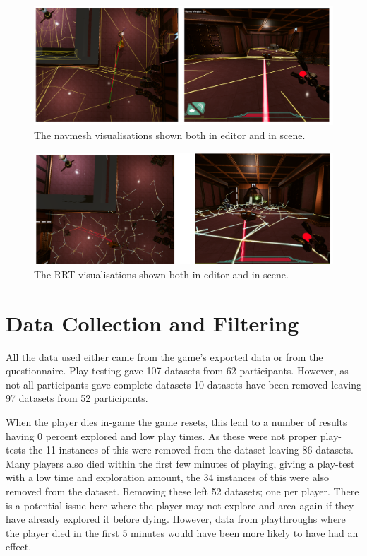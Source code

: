 \documentclass[journal]{IEEEtran}
\begin{document}
	\begin{figure}[h]
		\includegraphics[width=1.0\linewidth]{NavmeshVis.png}
		\caption{The navmesh visualisations shown both in editor and in scene.}
		\label{image:navmeshVisuals}
	\end{figure}  
	
	
	\begin{figure}[h]
		\includegraphics[width=1.0\linewidth]{RRTVis.png}
		\caption{The RRT visualisations shown both in editor and in scene.}
		\label{image:RRTVisuals}
	\end{figure}  
	
	\section{Data Collection and Filtering}  \label{datacollection}
	All the data used either came from the game's exported data or from the questionnaire.  Play-testing gave 107 datasets from 62 participants. However, as not all participants gave complete datasets 10 datasets have been removed leaving 97 datasets from 52 participants. 
	
	When the player dies in-game the game resets, this lead to a number of results having 0 percent explored and low play times. As these were not proper play-tests the 11 instances of this were removed from the dataset leaving 86 datasets. Many players also died within the first few minutes of playing, giving a play-test with a low time and exploration amount, the 34 instances of this were also removed from the dataset. Removing these left 52 datasets; one per player. There is a potential issue here where the player may not explore and area again if they have already explored it before dying. However, data from playthroughs where the player died in the first 5 minutes would have been more likely to have had an effect. 
	
\end{document}
